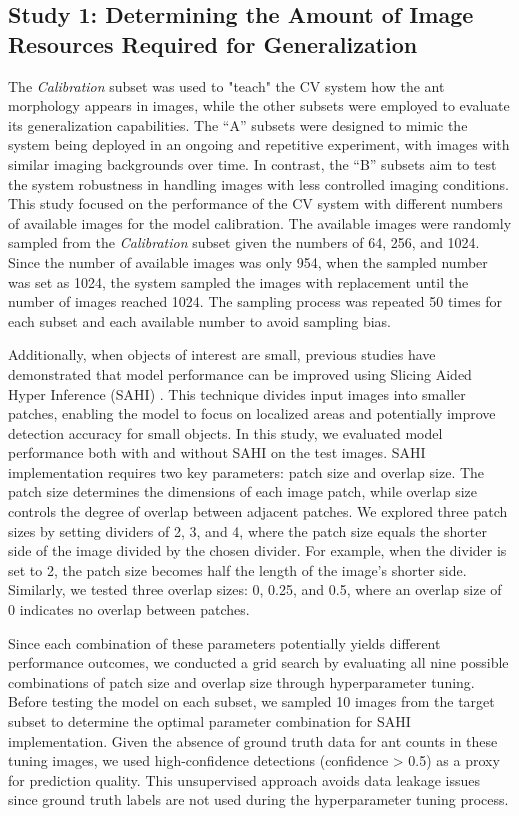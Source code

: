 \subsection{Study 1: Determining the Amount of Image Resources Required for Generalization}

The \textit{Calibration} subset was used to "teach" the CV system how the ant morphology appears in images, while the other subsets were employed to evaluate its generalization capabilities. The “A” subsets were designed to mimic the system being deployed in an ongoing and repetitive experiment, with images with similar imaging backgrounds over time. In contrast, the “B” subsets aim to test the system robustness in handling images with less controlled imaging conditions. This study focused on the performance of the CV system with different numbers of available images for the model calibration. The available images were randomly sampled from the \textit{Calibration} subset given the numbers of 64, 256, and 1024. Since the number of available images was only 954, when the sampled number was set as 1024, the system sampled the images with replacement until the number of images reached 1024. The sampling process was repeated 50 times for each subset and each available number to avoid sampling bias. 

Additionally, when objects of interest are small, previous studies have demonstrated that model performance can be improved using Slicing Aided Hyper Inference (SAHI) \cite{akyon_slicing_2022}. This technique divides input images into smaller patches, enabling the model to focus on localized areas and potentially improve detection accuracy for small objects. In this study, we evaluated model performance both with and without SAHI on the test images. SAHI implementation requires two key parameters: patch size and overlap size. The patch size determines the dimensions of each image patch, while overlap size controls the degree of overlap between adjacent patches. We explored three patch sizes by setting dividers of 2, 3, and 4, where the patch size equals the shorter side of the image divided by the chosen divider. For example, when the divider is set to 2, the patch size becomes half the length of the image's shorter side. Similarly, we tested three overlap sizes: 0, 0.25, and 0.5, where an overlap size of 0 indicates no overlap between patches.

Since each combination of these parameters potentially yields different performance outcomes, we conducted a grid search by evaluating all nine possible combinations of patch size and overlap size through hyperparameter tuning. Before testing the model on each subset, we sampled 10 images from the target subset to determine the optimal parameter combination for SAHI implementation. Given the absence of ground truth data for ant counts in these tuning images, we used high-confidence detections (confidence > 0.5) as a proxy for prediction quality. This unsupervised approach avoids data leakage issues since ground truth labels are not used during the hyperparameter tuning process.

